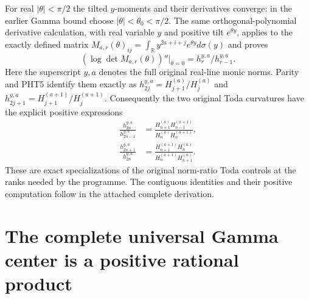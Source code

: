 For real $|\theta|<\pi/2$ the tilted $y$-moments and their
derivatives converge: in the earlier Gamma bound choose
$|\theta|<\theta_0<\pi/2$. The same orthogonal-polynomial
derivative calculation, with real variable $y$ and positive
tilt $e^{\theta y}$, applies to the exactly defined matrix
$M_{a,r}(\theta)_{ij}=\int_{\mathbb R}y^{2a+i+j}
e^{\theta y}d\sigma(y)$ and proves
\[
 (\log\det M_{a,r}(\theta))''\big|_{\theta=0}
   =h_r^{y,a}/h_{r-1}^{y,a}.
\tag{PHT18}
\]
Here the superscript $y,a$ denotes the full original real-line
monic norms. Parity and PHT5 identify them exactly as
$h_{2j}^{y,a}=H_{j+1}^{(a)}/H_j^{(a)}$ and
$h_{2j+1}^{y,a}=H_{j+1}^{(a+1)}/H_j^{(a+1)}$.
Consequently the two original Toda curvatures have the explicit
positive expressions
\[
\begin{aligned}
 \frac{h_{2n}^{y,a}}{h_{2n-1}^{y,a}}
 &=\frac{H_{n+1}^{(a)}H_{n-1}^{(a+1)}}
        {H_n^{(a)}H_n^{(a+1)}},\\
 \frac{h_{2n+1}^{y,a}}{h_{2n}^{y,a}}
 &=\frac{H_{n+1}^{(a+1)}H_n^{(a)}}
        {H_n^{(a+1)}H_{n+1}^{(a)}}.
\end{aligned}\tag{PHT19}
\]
These are exact specializations of the original norm-ratio
Toda controls at the ranks needed by the programme. The
contiguous identities and their positive computation follow
in the attached complete derivation.



\section{The complete universal Gamma center is a positive rational product}

